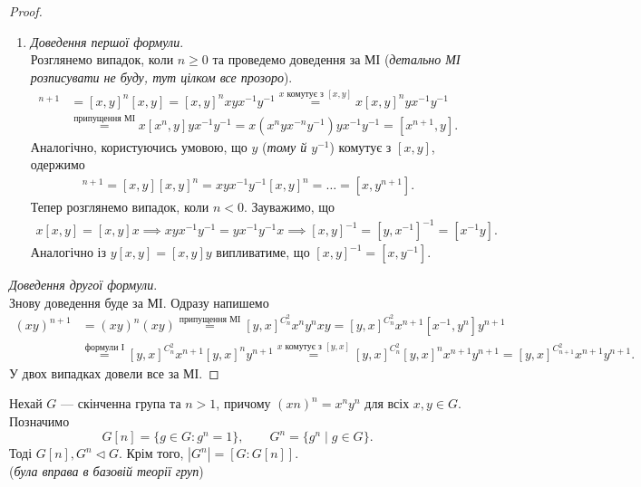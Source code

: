 \documentclass{math_library}
\begin{document}
\begin{proof}
\begin{enumerate}[topsep=0pt,wide=0pt,label={\Roman*.}]
\item \textit{Доведення першої формули}.\\
Розглянемо випадок, коли $n \geq 0$ та проведемо доведення за МІ (\textit{детально МІ розписувати не буду, тут цілком все прозоро}).
\begin{align*}
[x,y]^{n+1} & = [x,y]^n [x,y] = [x,y]^n xyx^{-1}y^{-1} \overset{\text{$x$ комутує з $[x,y]$}}{=} x [x,y]^n yx^{-1}y^{-1} \\ & \overset{\text{припущення МІ}}{=} x[x^n,y]yx^{-1}y^{-1} = x(x^nyx^{-n}y^{-1})yx^{-1}y^{-1} = [x^{n+1},y].
\end{align*}
Аналогічно, користуючись умовою, що $y$ (\textit{тому й $y^{-1}$}) комутує з $[x,y]$, одержимо
\begin{align*}
[x,y]^{n+1} = [x,y][x,y]^n = xyx^{-1}y^{-1} [x,y]^n = \dots = [x,y^{n+1}].
\end{align*}
Тепер розглянемо випадок, коли $n < 0$. Зауважимо, що
\begin{align*}
x [x,y] = [x,y] x \implies xyx^{-1}y^{-1} = yx^{-1}y^{-1}x \implies [x,y]^{-1} = [y,x^{-1}]^{-1} = [x^{-1}y].
\end{align*}
Аналогічно із $y[x,y] = [x,y]y$ випливатиме, що $[x,y]^{-1} = [x,y^{-1}]$.
\end{enumerate}

\item \textit{Доведення другої формули}.\\
Знову доведення буде за МІ. Одразу напишемо
\begin{align*}
(xy)^{n+1} & = (xy)^n (xy) \overset{\text{припущення МІ}}{=} [y,x]^{C_n^2} x^n y^n xy = [y,x]^{C_n^2} x^{n+1} [x^{-1},y^n] y^{n+1} \\
& \overset{\text{формули І}}{=} [y,x]^{C_n^2} x^{n+1} [y,x]^n y^{n+1} \overset{\text{$x$ комутує з $[y,x]$}}{=} [y,x]^{C_n^2} [y,x]^n x^{n+1} y^{n+1} = [y,x]^{C_{n+1}^2} x^{n+1} y^{n+1}.
\end{align*}
У двох випадках довели все за МІ.
\end{proof}

\begin{lemma}
Нехай $G$ --- скінченна група та $n > 1$, причому $(xn)^n = x^n y^n$ для всіх $x,y \in G$. Позначимо
\[
G[n] = \{g \in G: g^n = 1\}, \qquad G^n = \{ g^n \mid g \in G\}.
\]
Тоді $G[n], G^n \triangleleft G$. Крім того, $|G^n| = [G:G[n]]$.\\
(\textit{була вправа в базовій теорії груп})
\end{lemma}
\end{document}
